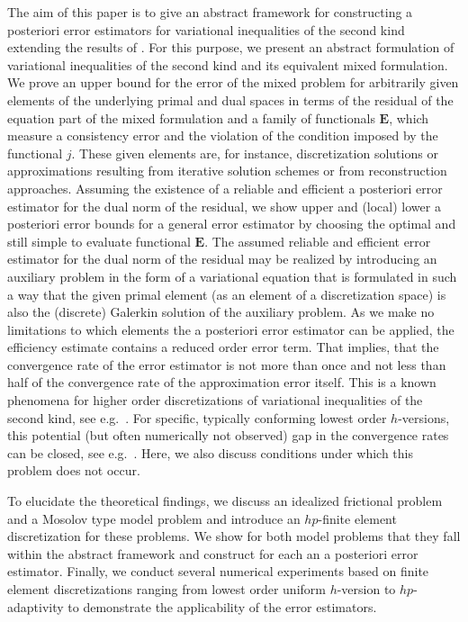 \documentclass[12pt,twoside,reqno]{amsart}
\theoremstyle{definition}
\numberwithin{equation}{section}
\begin{document}
The aim of this paper is to give an abstract framework for constructing a posteriori error estimators for variational inequalities of the second kind extending the results of \cite{Banz2021}. For this purpose, we present an abstract formulation of variational inequalities of the second kind and its equivalent mixed formulation. We prove an upper bound for the error of the mixed problem for arbitrarily given elements of the underlying primal and dual spaces in terms of the residual of the equation part of the mixed formulation and a family of functionals $\bm{E}$, which measure a consistency error and the violation of the condition imposed by the functional $j$. These given elements are, for instance, discretization solutions or approximations resulting from iterative solution schemes or from reconstruction approaches. Assuming the existence of a reliable and efficient a posteriori error estimator for the dual norm of the residual, we show upper and (local) lower a posteriori error bounds  for a general error estimator by choosing the optimal and still simple to evaluate functional $\bm{E}$.  The assumed reliable and efficient error estimator for the dual norm of the residual may be realized by introducing an auxiliary problem in the form of a variational equation that is formulated in such a way that the given primal element (as an element of a discretization space) is also the (discrete) Galerkin solution of the auxiliary problem. As we make no limitations to which elements the a posteriori error estimator can be applied, the efficiency estimate contains a reduced order error term. That implies, that the convergence rate of the error estimator is not more than once and not less than half of the convergence rate of the approximation error itself. This is a known phenomena for higher order discretizations of variational inequalities of the second kind, see e.g.~\cite{Banz2022,Banz2024,Bammer2025e}. For specific, typically conforming lowest order $h$-versions, this potential (but often numerically not observed) gap in the convergence rates can be closed, see e.g.~\cite{Carstensen2006a,Bammer2025e,Schroder2011}. Here, we also discuss conditions under which this problem does not occur.


To elucidate the theoretical findings, we discuss an idealized frictional problem and a Mosolov type model problem and introduce an $hp$-finite element discretization for these problems. We show for both model problems that they fall within the abstract framework and construct for each an a posteriori error estimator. Finally, we conduct several numerical experiments based on finite element discretizations ranging from lowest order uniform $h$-version to $hp$-adaptivity to demonstrate the applicability of the error estimators.
\end{document}
